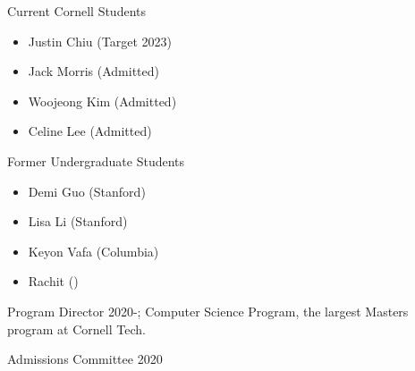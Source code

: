 \documentclass[10pt]{article}
\begin{document}
\ind Current Cornell Students

\begin{itemize}
\item Justin Chiu (Target 2023)
\item Jack Morris (Admitted)
\item Woojeong Kim (Admitted)
\item Celine Lee (Admitted)
\end{itemize}

\ind Former Undergraduate Students

\begin{itemize}
\item Demi Guo (Stanford)
\item Lisa Li (Stanford)
\item Keyon Vafa (Columbia)
\item Rachit ()

\end{itemize}


\medskip

\ind Program Director 2020-; Computer Science Program, the largest Masters program at Cornell Tech.

\ind Admissions Committee 2020
\bigskip


\end{document}

